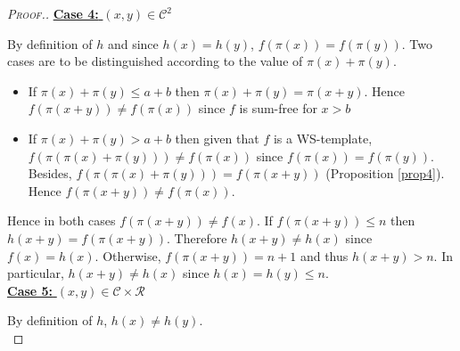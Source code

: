 \begin{proof}[\textsc{Proof.}]
\noindent \underline{\textbf{Case 4:} \((x,y) \in \mathcal{C}^2\)}
\par
By definition of \(h\) and since \(h(x)=h(y)\), \(f(\pi(x)) = f(\pi(y))\). Two cases are to be distinguished according
to the value of \(\pi(x)+\pi(y)\).
\begin{itemize}
\item If \(\pi(x) + \pi(y) \leqslant a+b\) then \(\pi(x)+\pi(y) = \pi(x + y)\). Hence \(f(\pi(x + y)) \neq f(\pi(x))\) since
	\(f\) is sum-free for \(x>b\)
\item \begin{sloppypar}
	If \(\pi(x)+\pi(y)>a+b\) then given that \(f\) is a WS-template, \({f(\pi(\pi(x)+\pi(y))) \neq f(\pi(x))}\) since
	\({f(\pi(x)) = f(\pi(y))}\). Besides,  \({f(\pi(\pi(x)+\pi(y))) = f(\pi(x + y))}\) (Proposition \ref{prop4}). Hence \({f(\pi(x + y))
	\neq  f(\pi(x))}\).
	\end{sloppypar}
\end{itemize}
\par
Hence in both cases \(f(\pi(x+y)) \neq f(x)\). If  \(f(\pi(x+y)) \leqslant n\) then \(h(x+y) = f(\pi(x+y))\). Therefore
\(h(x+y) \neq h(x)\) since \(f(x) = h(x)\). Otherwise, \(f(\pi(x+y)) = n + 1\) and thus \(h(x+y) > n\). In particular,
\(h(x + y) \neq h(x)\) since \(h(x) = h(y) \leqslant n\). \\

\noindent \underline{\textbf{Case 5:} \((x,y) \in \mathcal{C} \times \mathcal{R}\)}
\par
By definition of \(h\), \(h(x) \neq h(y)\).\\


\end{proof}
